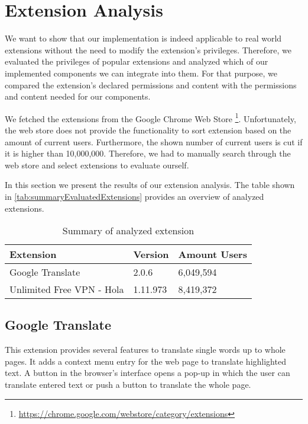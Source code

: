 
\chapter{Extension Analysis}
	
	We want to show that our implementation is indeed applicable to real world extensions without the need to modify the extension's privileges. Therefore, we evaluated the privileges of popular extensions and analyzed which of our implemented components we can integrate into them. For that purpose, we compared the extension's declared permissions and content with the permissions and content needed for our components. 
	
	We fetched the extensions from the Google Chrome Web Store \footnote{\url{https://chrome.google.com/webstore/category/extensions}}. Unfortunately, the web store does not provide the functionality to sort extension based on the amount of current users. Furthermore, the shown number of current users is cut if it is higher than 10,000,000. Therefore, we had to manually search through the web store and select extensions to evaluate ourself. 
	
	In this section we present the results of our extension analysis. The table shown in \autoref{tab:summaryEvaluatedExtensions} provides an overview of analyzed extensions.
	
	\begin{table}[h]
		\centering
		\begin{tabular}{|l|l|l|} \hline
			\textbf{Extension} & \textbf{Version} & \textbf{Amount Users} \\ \hline
			Google Translate & 2.0.6 & 6,049,594 \\ 
			Unlimited Free VPN - Hola & 1.11.973 & 8,419,372 \\ \hline
		\end{tabular}
		\caption{Summary of analyzed extension}
		\label{tab:summaryEvaluatedExtensions}
	\end{table}
	
	
\section{Google Translate}
	This extension provides several features to translate single words up to whole pages. It adds a context menu entry for the web page to translate highlighted text. A button in the browser's interface opens a pop-up in which the user can translate entered text or push a button to translate the whole page.
	
